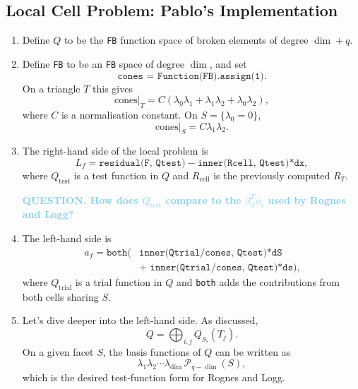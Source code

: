 \documentclass[12pt,a4paper]{article}
\newcommand{\skyblue}[1]{\textcolor{SkyBlue}{#1}}
\newcommand{\PP}{\mathcal{P}}
\newcommand{\qtest}{Q_{\mathrm{test}}}
\newcommand{\qtrial}{Q_{\mathrm{trial}}}
\newcommand{\rCell}{R_{\mathrm{cell}}}
\newcommand{\cones}{\mathrm{cones}}
\begin{document}
\subsection{Local Cell Problem: Pablo's Implementation}
\begin{enumerate}[label=\roman*)]
    \item Define $Q$ to be the \texttt{FB} function space of broken elements of degree $\dim+q$.

    \item Define \texttt{FB} to be an \texttt{FB} space of degree $\dim$, and set
    \begin{equation}
        \texttt{cones = Function(FB).assign(1)}.
    \end{equation}
    On a triangle $T$ this gives
    \begin{equation}
        \cones|_T=C(\lambda_0\lambda_1+\lambda_1\lambda_2+\lambda_0\lambda_2),
    \end{equation}
    where $C$ is a normalisation constant. On $S=\{\lambda_0=0\}$,
    \begin{equation}
        \cones|_S=C\lambda_1\lambda_2.
    \end{equation}

    \item The right-hand side of the local problem is
    \begin{equation}
        L_f=\texttt{residual(F, Qtest)}
              -\texttt{inner(Rcell, Qtest)*dx},
    \end{equation}
    where $\qtest$ is a test function in $Q$ and $\rCell$ is the previously computed $R_T$.

    \medskip
    \textbf{\skyblue{QUESTION. How does $\qtest$ compare to the $\beta_S^T\phi_i$ used by Rognes and Logg?}}
    \medskip

    \item The left-hand side is
    \begin{equation}
    \begin{aligned}
        a_f=\texttt{both(}&\texttt{inner(Qtrial/cones, Qtest)*dS}\\
                         &\texttt{+ inner(Qtrial/cones, Qtest)*ds}\texttt{)},
    \end{aligned}
    \end{equation}
    where $\qtrial$ is a trial function in $Q$ and \texttt{both} adds the contributions from both cells sharing $S$.

    \item Let's dive deeper into the left-hand side. 
    As discussed,
    \begin{equation}
        Q=\bigoplus_{i,j}Q_{S_i}(T_j).
    \end{equation}
    On a given facet $S$, the basis functions of $Q$ can be written as
    \begin{equation}
        \lambda_1\lambda_2\cdots\lambda_{\dim}\,\PP_{q-\dim}(S),
    \end{equation}
    which is the desired test-function form for Rognes and Logg.


\end{enumerate}
\end{document}
